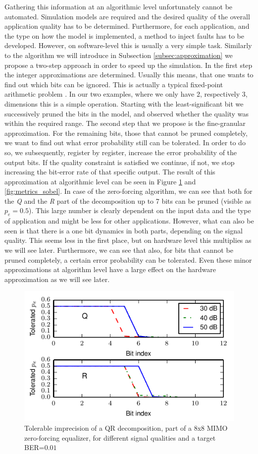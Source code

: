 \documentclass[conference]{IEEEtran}
\begin{document}
Gathering this information at an algorithmic level unfortunately cannot be automated. Simulation models are required and the desired quality of the overall application quality has to be determined. Furthermore, for each application, and the type on how the model is implemented, a method to inject faults has to be developed. However, on software-level this is usually a very simple task. Similarly to the algorithm we will introduce in Subsection \ref{subsec:approximation} we propose a two-step approach in order to speed up the simulation. In the first step the integer approximations are determined. Usually this means, that one wants to find out which bits can be ignored. This is actually a typical fixed-point arithmetic problem \cite{yates2009fixed}. In our two examples, where we only have 2, respectively 3, dimensions this is a simple operation. Starting with the least-significant bit we successively pruned the bits in the model, and observed whether the quality was within the required range. The second step that we propose is the fine-granular approximation. For the remaining bits, those that cannot be pruned completely, we want to find out what error probability still can be tolerated. In order to do so, we subsequently, register by register, increase the error probability of the output bits. If the quality constraint is satisfied we continue, if not, we stop increasing the bit-error rate of that specific output. The result of this approximation at algorithmic level can be seen in Figure \ref{fig:metrics_qr} and \ref{fig:metrics_sobel}. In case of the zero-forcing algorithm, we can see that both for the \emph{Q} and the \emph{R} part of the decomposition up to 7 bits can be pruned (visible as $p_e=0.5$). This large number is clearly dependent on the input data and the type of application and might be less for other applications. However, what can also be seen is that there is a one bit dynamics in both parts, depending on the signal quality. This seems less in the first place, but on hardware level this multiplies as we will see later. Furthermore, we can see that also, for bits that cannot be pruned completely, a certain error probability can be tolerated. Even these minor approximations at algorithm level have a large effect on the hardware approximation as we will see later.
\begin{figure}[tb]
  \centering
  \includegraphics[width=.48\textwidth]{figs/metrics_qr}
  \caption{Tolerable imprecision of a QR decomposition, part of a 8x8 MIMO zero-forcing equalizer, for different signal qualities and a target BER=$0.01$}
  \label{fig:metrics_qr}
\end{figure}
\end{document}
